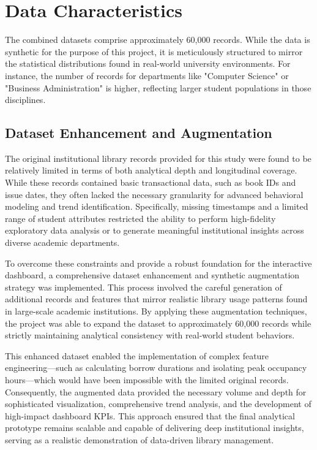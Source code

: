 \documentclass[12pt,a4paper]{report}
\begin{document}
\section{Data Characteristics}
The combined datasets comprise approximately 60,000 records. While the data is synthetic for the purpose of this project, it is meticulously structured to mirror the statistical distributions found in real-world university environments. For instance, the number of records for departments like "Computer Science" or "Business Administration" is higher, reflecting larger student populations in those disciplines.

\subsection{Dataset Enhancement and Augmentation}
The original institutional library records provided for this study were found to be relatively limited in terms of both analytical depth and longitudinal coverage. While these records contained basic transactional data, such as book IDs and issue dates, they often lacked the necessary granularity for advanced behavioral modeling and trend identification. Specifically, missing timestamps and a limited range of student attributes restricted the ability to perform high-fidelity exploratory data analysis or to generate meaningful institutional insights across diverse academic departments.

To overcome these constraints and provide a robust foundation for the interactive dashboard, a comprehensive dataset enhancement and synthetic augmentation strategy was implemented. This process involved the careful generation of additional records and features that mirror realistic library usage patterns found in large-scale academic institutions. By applying these augmentation techniques, the project was able to expand the dataset to approximately 60,000 records while strictly maintaining analytical consistency with real-world student behaviors.

This enhanced dataset enabled the implementation of complex feature engineering---such as calculating borrow durations and isolating peak occupancy hours---which would have been impossible with the limited original records. Consequently, the augmented data provided the necessary volume and depth for sophisticated visualization, comprehensive trend analysis, and the development of high-impact dashboard KPIs. This approach ensured that the final analytical prototype remains scalable and capable of delivering deep institutional insights, serving as a realistic demonstration of data-driven library management.
\end{document}
